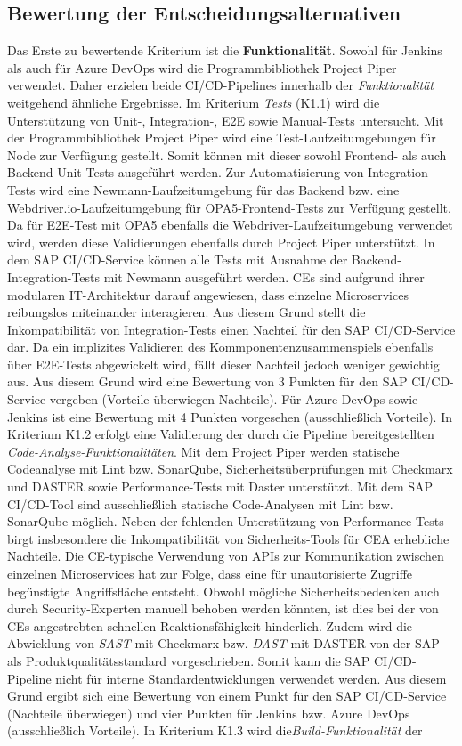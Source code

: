 \subsection{Bewertung der Entscheidungsalternativen}
\label{sec:Bewertung}
Das Erste zu bewertende Kriterium ist die \textbf{Funktionalität}. Sowohl für Jenkins als auch für Azure DevOps wird die Programmbibliothek Project Piper verwendet. Daher erzielen beide CI/CD-Pipelines innerhalb der \textit{Funktionalität} weitgehend ähnliche Ergebnisse.
Im Kriterium \textit{Tests} (K1.1) wird die Unterstützung von Unit-, Integration-, E2E sowie Manual-Tests untersucht. Mit der Programmbibliothek Project Piper wird eine Test-Laufzeitumgebungen für Node zur Verfügung gestellt. Somit können mit dieser sowohl Frontend- als auch Backend-Unit-Tests ausgeführt werden. Zur Automatisierung von Integration-Tests wird eine Newmann-Laufzeitumgebung für das Backend bzw. eine Webdriver.io-Laufzeitumgebung für OPA5-Frontend-Tests zur Verfügung gestellt. Da für E2E-Test mit OPA5 ebenfalls die Webdriver-Laufzeitumgebung verwendet wird, werden diese Validierungen ebenfalls durch Project Piper unterstützt. In dem SAP CI/CD-Service können alle Tests mit Ausnahme der Backend-Integration-Tests mit Newmann ausgeführt werden. CEs sind aufgrund ihrer modularen IT-Architektur darauf angewiesen, dass einzelne Microservices reibungslos miteinander interagieren. Aus diesem Grund stellt die Inkompatibilität von Integration-Tests einen Nachteil für den SAP CI/CD-Service dar. Da ein implizites Validieren des Kommponentenzusammenspiels ebenfalls über E2E-Tests abgewickelt wird, fällt dieser Nachteil jedoch weniger gewichtig aus. Aus diesem Grund wird eine Bewertung von 3 Punkten für den SAP CI/CD-Service vergeben (Vorteile überwiegen Nachteile). Für Azure DevOps sowie Jenkins ist eine Bewertung mit 4 Punkten vorgesehen (ausschließlich Vorteile). In Kriterium K1.2 erfolgt eine Validierung der durch die Pipeline bereitgestellten \textit{Code-Analyse-Funktionalitäten}. Mit dem Project Piper werden statische Codeanalyse mit Lint bzw. SonarQube, Sicherheitsüberprüfungen mit Checkmarx und DASTER sowie Performance-Tests mit Daster unterstützt. Mit dem SAP CI/CD-Tool sind ausschließlich statische Code-Analysen mit Lint bzw. SonarQube möglich. Neben der fehlenden Unterstützung von Performance-Tests birgt insbesondere die Inkompatibilität von Sicherheits-Tools  für CEA erhebliche Nachteile. Die CE-typische Verwendung von APIs zur Kommunikation zwischen einzelnen Microservices hat zur Folge, dass eine für unautorisierte Zugriffe begünstigte Angriffsfläche entsteht. Obwohl mögliche Sicherheitsbedenken auch durch Security-Experten manuell behoben werden könnten, ist dies bei der von CEs angestrebten schnellen Reaktionsfähigkeit hinderlich. Zudem wird die Abwicklung von \textit{\ac{SAST}} mit Checkmarx bzw. \textit{\ac{DAST}} mit DASTER von der SAP als Produktqualitätsstandard vorgeschrieben. Somit kann die SAP CI/CD-Pipeline nicht für interne Standardentwicklungen verwendet werden. Aus diesem Grund ergibt sich eine Bewertung von einem Punkt für den SAP CI/CD-Service (Nachteile überwiegen) und vier Punkten für Jenkins bzw. Azure DevOps (ausschließlich Vorteile). In Kriterium K1.3 wird die\textit{Build-Funktionalität} der 